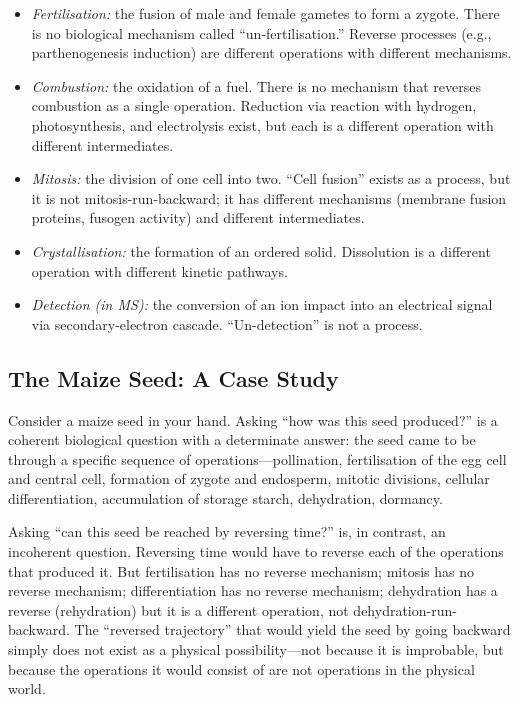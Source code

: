 \documentclass[twocolumn,10pt,a4paper]{article}
\theoremstyle{definition}
\theoremstyle{remark}
\begin{document}
\begin{itemize}[leftmargin=1.2em,itemsep=0.2em]
    \item \emph{Fertilisation:} the fusion of male and female gametes to form a zygote. There is no biological mechanism called ``un-fertilisation.'' Reverse processes (e.g., parthenogenesis induction) are different operations with different mechanisms.

    \item \emph{Combustion:} the oxidation of a fuel. There is no mechanism that reverses combustion as a single operation. Reduction via reaction with hydrogen, photosynthesis, and electrolysis exist, but each is a different operation with different intermediates.

    \item \emph{Mitosis:} the division of one cell into two. ``Cell fusion'' exists as a process, but it is not mitosis-run-backward; it has different mechanisms (membrane fusion proteins, fusogen activity) and different intermediates.

    \item \emph{Crystallisation:} the formation of an ordered solid. Dissolution is a different operation with different kinetic pathways.

    \item \emph{Detection (in MS):} the conversion of an ion impact into an electrical signal via secondary-electron cascade. ``Un-detection'' is not a process.
\end{itemize}

\subsection{The Maize Seed: A Case Study}

Consider a maize seed in your hand. Asking ``how was this seed produced?'' is a coherent biological question with a determinate answer: the seed came to be through a specific sequence of operations---pollination, fertilisation of the egg cell and central cell, formation of zygote and endosperm, mitotic divisions, cellular differentiation, accumulation of storage starch, dehydration, dormancy.

Asking ``can this seed be reached by reversing time?'' is, in contrast, an incoherent question. Reversing time would have to reverse each of the operations that produced it. But fertilisation has no reverse mechanism; mitosis has no reverse mechanism; differentiation has no reverse mechanism; dehydration has a reverse (rehydration) but it is a different operation, not dehydration-run-backward. The ``reversed trajectory'' that would yield the seed by going backward simply does not exist as a physical possibility---not because it is improbable, but because the operations it would consist of are not operations in the physical world.
\end{document}
